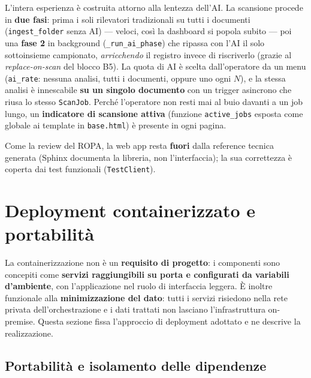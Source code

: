 L'intera esperienza è costruita attorno alla lentezza dell'AI. La scansione procede in \textbf{due fasi}: prima i soli rilevatori tradizionali su tutti i documenti (\texttt{ingest\_folder} senza AI) --- veloci, così la dashboard si popola subito --- poi una \textbf{fase 2} in background (\texttt{\_run\_ai\_phase}) che ripassa con l'AI il solo sottoinsieme campionato, \emph{arricchendo} il registro invece di riscriverlo (grazie al \emph{replace-on-scan} del blocco B5). La quota di AI è scelta dall'operatore da un menu (\texttt{ai\_rate}: nessuna analisi, tutti i documenti, oppure uno ogni $N$), e la stessa analisi è innescabile \textbf{su un singolo documento} con un trigger asincrono che riusa lo stesso \texttt{ScanJob}. Perché l'operatore non resti mai al buio davanti a un job lungo, un \textbf{indicatore di scansione attiva} (funzione \texttt{active\_jobs} esposta come globale ai template in \texttt{base.html}) è presente in ogni pagina.

Come la review del ROPA, la web app resta \textbf{fuori} dalla reference tecnica generata (Sphinx documenta la libreria, non l'interfaccia); la sua correttezza è coperta dai test funzionali (\texttt{TestClient}).

\section{Deployment containerizzato e portabilità}
\label{sec:containerizzazione}

La containerizzazione non è un \textbf{requisito di progetto}: i componenti sono concepiti come \textbf{servizi raggiungibili su porta e configurati da variabili d'ambiente}, con l'applicazione nel ruolo di interfaccia leggera. È inoltre funzionale alla \textbf{minimizzazione del dato}: tutti i servizi risiedono nella rete privata dell'orchestrazione e i dati trattati non lasciano l'infrastruttura on-premise. Questa sezione fissa l'approccio di deployment adottato e ne descrive la realizzazione.

\subsection{Portabilità e isolamento delle dipendenze}
\label{sub:container-portabilita}


